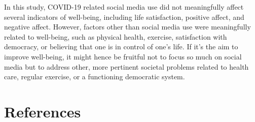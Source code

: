 \documentclass[
  english,
  man,mask,floatsintext]{apa6}
\begin{document}
In this study, COVID-19 related social media use did not meaningfully affect several indicators of well-being, including life satisfaction, positive affect, and negative affect.
However, factors other than social media use were meaningfully related to well-being, such as physical health, exercise, satisfaction with democracy, or believing that one is in control of one's life.
If it's the aim to improve well-being, it might hence be fruitful not to focus so much on social media but to address other, more pertinent societal problems related to health care, regular exercise, or a functioning democratic system.

\newpage

\hypertarget{references}{%
\section{References}\label{references}}
\end{document}
